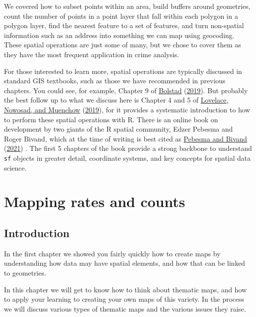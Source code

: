 \documentclass[
  krantz2]{krantz}
\begin{document}
We covered how to subset points within an area, build buffers around geometries, count the number of points in a point layer that fall within each polygon in a polygon layer, find the nearest feature to a set of features, and turn non-spatial information such as an address into something we can map using geocoding. These spatial operations are just some of many, but we chose to cover them as they have the most frequent application in crime analysis.

For those interested to learn more, spatial operations are typically discussed in standard GIS textbooks, such as those we have recommended in previous chapters. You could see, for example, Chapter 9 of \protect\hyperlink{ref-Bolstad_2019}{Bolstad} (\protect\hyperlink{ref-Bolstad_2019}{2019}). But probably the best follow up to what we discuss here is Chapter 4 and 5 of \protect\hyperlink{ref-Lovelace_2019}{Lovelace, Nowosad, and Muenchow} (\protect\hyperlink{ref-Lovelace_2019}{2019}), for it provides a systematic introduction to how to perform these spatial operations with R. There is an online book on development by two giants of the R spatial community, Edzer Pebesma and Roger Bivand, which at the time of writing is best cited as \protect\hyperlink{ref-Pebesma_2021}{Pebesma and Bivand} (\protect\hyperlink{ref-Pebesma_2021}{2021}) . The first 5 chapters of the book provide a strong backbone to understand \texttt{sf} objects in greater detail, coordinate systems, and key concepts for spatial data science.

\hypertarget{mapping-rates-and-counts}{%
\chapter{Mapping rates and counts}\label{mapping-rates-and-counts}}

\hypertarget{introduction-2}{%
\section{Introduction}\label{introduction-2}}

In the first chapter we showed you fairly quickly how to create maps by understanding how data may have spatial elements, and how that can be linked to geometries.

In this chapter we will get to know how to think about thematic maps, and how to apply your learning to creating your own maps of this variety. In the process we will discuss various types of thematic maps and the various issues they raise.
\end{document}
